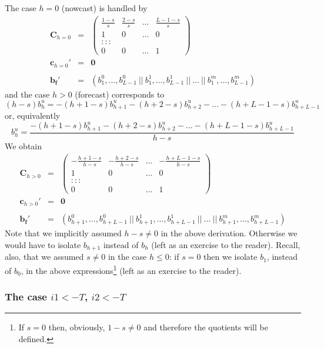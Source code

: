 \documentclass[a4paper]{book}
\begin{document}
The case $h=0$ (nowcast) is handled by
\begin{eqnarray*}%
\mathbf{C}_{h=0}&=&\left(\begin{array}{cccc}
\displaystyle{\frac{1-s}{s}}&\displaystyle{\frac{2-s}{s}}&...&\displaystyle{\frac{L-1-s}{s}}\\
1&0&...&0\\
:::\\
0&0&...&1
\end{array}\right)\nonumber\\
\mathbf{c}_{h=0}'&=&\mathbf{0}\\
\nonumber\\
\mathbf{b_f}'&=&(b_1^0,...,b_{L-1}^0~||~b_1^1,...,b_{L-1}^1~||~...~||~b_1^m,...,b_{L-1}^m)\nonumber\end{eqnarray*}
and the case $h>0$ (forecast) corresponds to 
\[
(h-s)b_h^u=-(h+1-s)b_{h+1}^u-(h+2-s)b_{h+2}^u-...-(h+L-1-s)b_{h+L-1}^u
\]
or, equivalently
\[
b_h^u=\frac{-(h+1-s)b_{h+1}^u-(h+2-s)b_{h+2}^u-...-(h+L-1-s)b_{h+L-1}^u}{h-s}
\]
We obtain
\begin{eqnarray*}%
\mathbf{C}_{h>0}&=&\left(\begin{array}{cccc}
-\displaystyle{\frac{h+1-s}{h-s}}&-\displaystyle{\frac{h+2-s}{h-s}}&...&-\displaystyle{\frac{h+L-1-s}{h-s}}\\
1&0&...&0\\
:::\\
0&0&...&1
\end{array}\right)\nonumber\\
\mathbf{c}_{h>0}'&=&\mathbf{0}\\
\nonumber\\
\mathbf{b_f}'&=&(b_{h+1}^0,...,b_{h+L-1}^0~||~b_{h+1}^1,...,b_{h+L-1}^1~||~...~||~b_{h+1}^m,...,b_{h+L-1}^m)\nonumber\end{eqnarray*}
Note that we implicitly assumed $h-s\neq 0$ in the above derivation. Otherwise we would have to isolate $b_{h+1}$ instead of $b_h$ (left as an exercise to the reader). Recall, also, that we assumed $s\neq 0$ in the case $h\leq 0$: if $s=0$ then we isolate $b_1$, instead of $b_0$, in the above expressions\footnote{If $s=0$ then, obviously, $1-s\neq 0$ and therefore the quotients will be defined.} (left as an exercise to the reader). 



\subsubsection{The case $i1<-T$, $i2<-T$}
\end{document}
